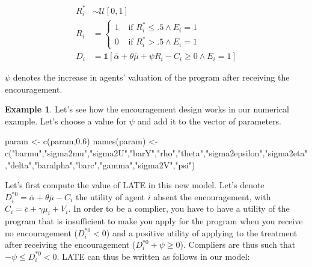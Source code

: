 \documentclass[
]{book}
\newenvironment{Shaded}{\begin{snugshade}}{\end{snugshade}}
\newcommand{\FloatTok}[1]{\textcolor[rgb]{0.00,0.00,0.81}{#1}}
\newcommand{\FunctionTok}[1]{\textcolor[rgb]{0.00,0.00,0.00}{#1}}
\newcommand{\NormalTok}[1]{#1}
\newcommand{\OtherTok}[1]{\textcolor[rgb]{0.56,0.35,0.01}{#1}}
\newcommand{\StringTok}[1]{\textcolor[rgb]{0.31,0.60,0.02}{#1}}
\newcommand{\uns}[1]{\mathds{1}[ #1 ]}
\theoremstyle{definition}
\theoremstyle{definition}
\newtheorem{example}{Example}[chapter]
\theoremstyle{definition}
\theoremstyle{definition}
\theoremstyle{remark}
\begin{document}
\begin{align*}
  R_i^* & \sim \mathcal{U}[0,1]\\
  R_i & = 
  \begin{cases}
    1 & \text{ if } R_i^*\leq .5 \land E_i=1\\
    0 & \text{ if } R_i^*> .5 \land E_i=1
  \end{cases} \\
  D_i & = \uns{\bar{\alpha}+\theta\bar{\mu}+\psi R_i-C_i\geq0 \land E_i=1}
\end{align*}

\(\psi\) denotes the increase in agents' valuation of the program after receiving the encouragement.

\begin{example}
\protect\hypertarget{exm:unnamed-chunk-117}{}{\label{exm:unnamed-chunk-117} }Let's see how the encouragement design works in our numerical example.
Let's choose a value for \(\psi\) and add it to the vector of parameters.
\end{example}

\begin{Shaded}
\begin{Highlighting}[]
\NormalTok{param }\OtherTok{\textless{}{-}} \FunctionTok{c}\NormalTok{(param,}\FloatTok{0.6}\NormalTok{)}
\FunctionTok{names}\NormalTok{(param) }\OtherTok{\textless{}{-}} \FunctionTok{c}\NormalTok{(}\StringTok{"barmu"}\NormalTok{,}\StringTok{"sigma2mu"}\NormalTok{,}\StringTok{"sigma2U"}\NormalTok{,}\StringTok{"barY"}\NormalTok{,}\StringTok{"rho"}\NormalTok{,}\StringTok{"theta"}\NormalTok{,}\StringTok{"sigma2epsilon"}\NormalTok{,}\StringTok{"sigma2eta"}\NormalTok{,}\StringTok{"delta"}\NormalTok{,}\StringTok{"baralpha"}\NormalTok{,}\StringTok{"barc"}\NormalTok{,}\StringTok{"gamma"}\NormalTok{,}\StringTok{"sigma2V"}\NormalTok{,}\StringTok{"psi"}\NormalTok{)}
\end{Highlighting}
\end{Shaded}

Let's first compute the value of LATE in this new model.
Let's denote \(D_i^{*0}=\bar{\alpha}+\theta\bar{\mu}-C_i\) the utility of agent \(i\) absent the encouragement, with \(C_i=\bar{c} + \gamma \mu_i + V_i\).
In order to be a complier, you have to have a utility of the program that is insufficient to make you apply for the program when you receive no encouragement (\(D_i^{*0}<0\)) and a positive utility of applying to the treatment after receiving the encouragement (\(D_i^{*0}+\psi\geq 0\)).
Compliers are thus such that \(-\psi\leq D_i^{*0}<0\).
LATE can thus be written as follows in our model:
\end{document}
